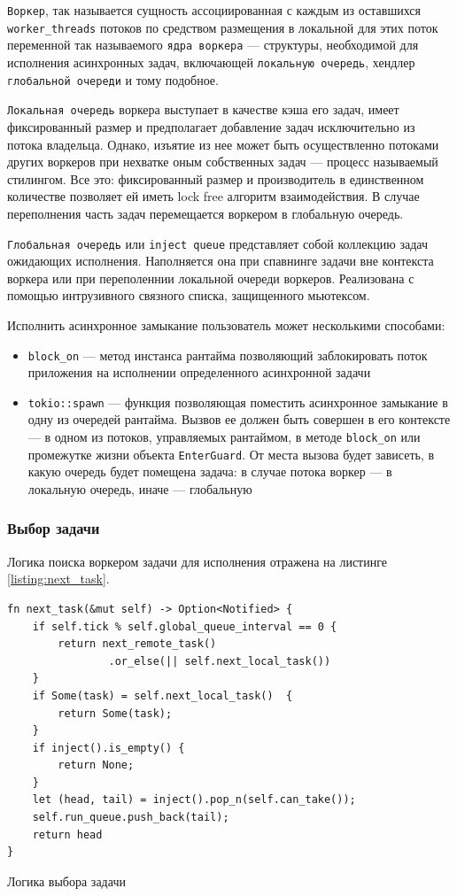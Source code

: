 \verb|Воркер|, так называется сущность ассоциированная с каждым из оставшихся \verb|worker_threads| потоков по средством размещения в локальной для этих поток переменной так называемого \verb|ядра воркера| --- структуры, необходимой для исполнения асинхронных задач, включающей \verb|локальную очередь|, хендлер \verb|глобальной очереди| и тому подобное.

\verb|Локальная очередь| воркера выступает в качестве кэша его задач, имеет фиксированный размер и предполагает добавление задач исключительно из потока владельца. Однако, изъятие из нее может быть осуществленно потоками других воркеров при нехватке оным собственных задач --- процесс называемый стилингом. Все это: фиксированный размер и производитель в единственном количестве позволяет ей иметь lock free алгоритм взаимодействия. В случае переполнения часть задач перемещается воркером в глобальную очередь.

\verb|Глобальная очередь| или \verb|inject queue| представляет собой коллекцию задач ожидающих исполнения. Наполняется она при спавнинге задачи вне контекста воркера или при переполеннии локальной очереди воркеров. Реализована с помощью интрузивного связного списка, защищенного мьютексом.

Исполнить асинхронное замыкание пользователь может несколькими способами:

\begin{itemize}
    \item \verb|block_on| --- метод инстанса рантайма позволяющий заблокировать поток приложения на исполнении определенного асинхронной задачи
    \item \verb|tokio::spawn| --- функция позволяющая поместить асинхронное замыкание в одну из очередей рантайма. Вызвов ее должен быть совершен в его контексте --- в одном из потоков, управляемых рантаймом, в методе \verb|block_on| или промежутке жизни объекта \verb|EnterGuard|. От места вызова будет зависеть, в какую очередь будет помещена задача: в случае потока воркер --- в локальную очередь, иначе --- глобальную
\end{itemize}

\subsubsection{Выбор задачи}

Логика поиска воркером задачи для исполнения отражена на листинге \ref{listing:next_task}.

\begin{listing}
    \begin{verbatim}
fn next_task(&mut self) -> Option<Notified> {
    if self.tick % self.global_queue_interval == 0 {
        return next_remote_task()
                .or_else(|| self.next_local_task())
    }
    if Some(task) = self.next_local_task()  {
        return Some(task);
    }
    if inject().is_empty() {
        return None;
    }
    let (head, tail) = inject().pop_n(self.can_take());
    self.run_queue.push_back(tail);
    return head
}
    \end{verbatim}

    \caption{Логика выбора задачи}
    \label{listing:next_task}
\end{listing}

